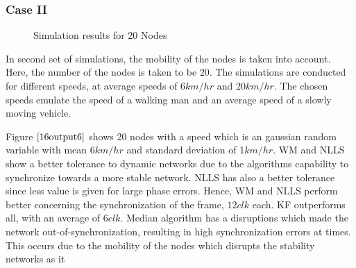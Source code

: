 \documentclass[journal]{IEEEtran}
\begin{document}
\subsubsection{\textbf{Case II}}
\begin{figure}
\centerline{
 \hfil {}} \caption{Simulation results for 20 Nodes}
\label{16output}
\end{figure}
In second set of simulations, the mobility of the nodes is taken into account. Here, the number of the nodes is taken to be $20$. The simulations are conducted for different speeds, at average speeds of $6km/hr$ and $20km/hr$. The chosen speeds emulate the speed of a walking man and an average speed of a slowly moving vehicle.
\par
Figure $\ref{16output6}$ shows 20 nodes with a speed which is an
gaussian random variable with mean $6km/hr$ and standard deviation
of 1$km/hr$. WM and NLLS show a better tolerance to dynamic networks
due to the algorithms capability to synchronize towards a more
stable network. NLLS has also a better tolerance since less value is
given for large phase errors. Hence, WM and NLLS perform better
concerning the synchronization of the frame, $12 clk$ each. KF
outperforms all, with an average of $6 clk$. Median algorithm has a
disruptions which made the network out-of-synchronization, resulting
in high synchronization errors at times. This occurs due to the
mobility of the nodes which disrupts the stability networks as it
\end{document}
